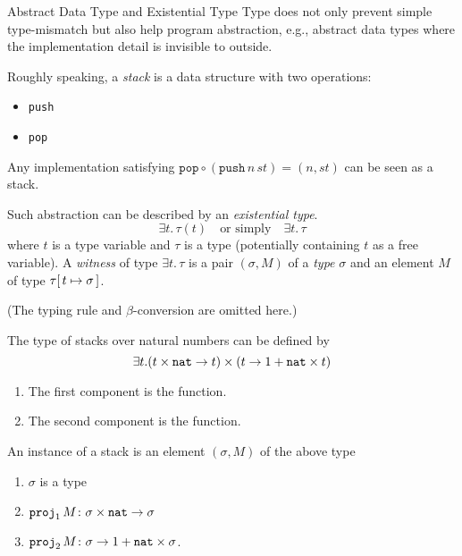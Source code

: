 \begin{frame}[allowframebreaks]{Abstract Data Type  and Existential Type}
  Type does not only prevent simple type-mismatch but also help program
  abstraction, e.g., abstract data types where the implementation detail is
  invisible to outside. 
  
  \begin{example}
    Roughly speaking, a \emph{stack} is a data structure with two operations:
    \begin{itemize}
      \item \texttt{push}
      \item \texttt{pop}
    \end{itemize}
    Any implementation satisfying $\mathtt{pop} \circ (\mathtt{push}\, n\, st) =
    (n, st)$ can be seen as a stack. 
  \end{example}
  \framebreak
  Such abstraction can be described by an \emph{existential type}.
  \[
    \exists t.\, \tau(t)
    \quad\text{or simply}\quad
    \exists t.\, \tau
  \]
  where $t$ is a type variable and $\tau$ is a type (potentially 
  containing $t$ as a free variable).
  A \emph{witness} of type $\exists t.\, \tau$ is a pair $(\sigma, M)$ of a
  \emph{type} $\sigma$ and an element $M$ of type $\tau[\,t\mapsto\sigma\,]$. 

  (The typing rule and $\beta$-conversion are omitted here.)
  \framebreak
  \begin{example}
    The type of stacks over natural numbers can be defined by
    \[
      \exists t. (t \times \mathtt{nat} \to t) \times (t \to 1 + \mathtt{nat} \times t) 
    \]
    \begin{enumerate}
      \item The first component is the  function.
      \item The second component is the  function.
    \end{enumerate}
    An instance of a stack is an element $(\sigma, M)$ of the above type
    \begin{enumerate}
      \item $\sigma$ is a type
      \item $\mathtt{proj}_1\, M \colon \sigma \times \mathtt{nat} \to \sigma$
      \item $\mathtt{proj}_2\, M \colon \sigma \to 1 + \mathtt{nat} \times
          \sigma$. 
    \end{enumerate}
  \end{example}
\end{frame}

